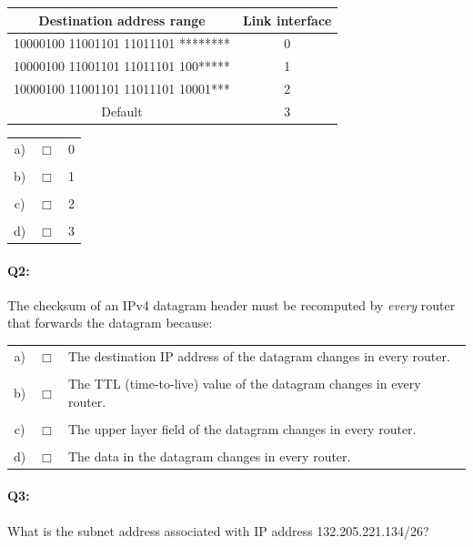 \documentclass{llncs}
\begin{document}
\begin{center}
\begin{tabular}{c|c}
  Destination address range & Link interface \\
  \hline
  10000100 11001101 11011101 ******** & 0\\
  \hline
  10000100 11001101 11011101 100***** & 1\\
  \hline
  10000100 11001101 11011101 10001*** & 2\\
  \hline
  Default  & 3
\end{tabular}
\end{center}

\begin{tabular}{ccl}
  a) & $\Box$ & 0\\
  \\
  b) & $\Box$ & 1\\
  \\
  c) & $\Box$ & 2\\
  \\
  d) & $\Box$ & 3\\
\end{tabular}

\vfill
\paragraph{\textbf{Q2:}}

The checksum of an IPv4 datagram header must be recomputed by \emph{every} router that forwards the datagram because:\\
\begin{tabular}{ccl}
  a) & $\Box$ & The destination IP address of the datagram changes in every router.\\
  \\
  b) & $\Box$ & The TTL (time-to-live) value of the datagram changes in every router.\\
  \\
  c) & $\Box$ & The upper layer field of the datagram changes in every router.\\
  \\
  d) & $\Box$ & The data in the datagram changes in every router.\\  
\end{tabular}

\vfill
\paragraph{\textbf{Q3:}}
What is the subnet address associated with IP address 132.205.221.134/26?
\end{document}
